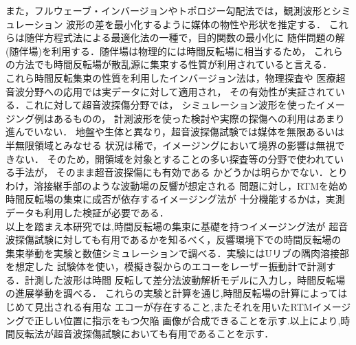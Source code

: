 また，フルウェーブ・インバージョンやトポロジー勾配法では，観測波形とシミュレーション
波形の差を最小化するように媒体の物性や形状を推定する．
これらは随伴方程式法による最適化法の一種で，目的関数の最小化に
随伴問題の解(随伴場)を利用する．随伴場は物理的には時間反転場に相当するため，
これらの方法でも時間反転場が散乱源に集束する性質が利用されていると言える．
\\
\hspace{\parindent}
これら時間反転集束の性質を利用したインバージョン法は，物理探査\cite{Fichtner, Etgen2009}や
医療超音波分野\cite{FinkTextBook, Tanter2000}への応用では実データに対して適用され，
その有効性が実証されている．これに対して超音波探傷分野では，
シミュレーション波形を使ったイメージング例\cite{KK_RTM,Saitoh2021}はあるものの，
計測波形を使った検討や実際の探傷への利用\cite{Nakahata2019}はあまり進んでいない．
地盤や生体と異なり，超音波探傷試験では媒体を無限あるいは半無限領域とみなせる
状況は稀で，イメージングにおいて境界の影響は無視できない．
そのため，開領域を対象とすることの多い探査等の分野で使われている手法が，
そのまま超音波探傷にも有効である
かどうかは明らかでない．とりわけ，溶接継手部のような波動場の反響が想定される
問題に対し，RTMを始め時間反転場の集束に成否が依存するイメージング法が
十分機能するかは，実測データも利用した検証が必要である．
\\
\hspace{\parindent}
以上を踏まえ本研究では,時間反転場の集束に基礎を持つイメージング法が
超音波探傷試験に対しても有用であるかを知るべく，反響環境下での時間反転場の
集束挙動を実験と数値シミュレーションで調べる．実験にはUリブの隅肉溶接部を想定した
試験体を使い，模擬き裂からのエコーをレーザー振動計で計測する．計測した波形は時間
反転して差分法波動解析モデルに入力し，時間反転場の進展挙動を調べる．
これらの実験と計算を通じ,時間反転場の計算によってはじめて見出される有用な
エコーが存在すること,またそれを用いたRTMイメージングで正しい位置に指示をもつ欠陥
画像が合成できることを示す.以上により,時間反転法が超音波探傷試験においても有用であることを示す．

